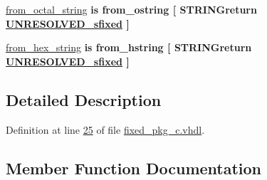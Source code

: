 \begin{DoxyCompactItemize}
\item 
\hyperlink{classfixed__pkg_ad03780406d82a1039546103c01b05ab0}{from\+\_\+octal\+\_\+string}  {\bfseries {\bfseries \textcolor{keywordflow}{is}\textcolor{vhdlchar}{ }\textcolor{vhdlchar}{from\+\_\+ostring}\textcolor{vhdlchar}{ }\textcolor{vhdlchar}{\mbox{[}}\textcolor{vhdlchar}{ }\textcolor{vhdlchar}{S\+T\+R\+I\+N\+Greturn}\textcolor{vhdlchar}{ }{\bfseries \hyperlink{classfixed__pkg_aa723b28a027c3c0f9bca02d75e8df4d6}{U\+N\+R\+E\+S\+O\+L\+V\+E\+D\+\_\+sfixed}} \textcolor{vhdlchar}{ }\textcolor{vhdlchar}{\mbox{]}}\textcolor{vhdlchar}{ }}} {\bfseries \textcolor{vhdlchar}{ }} 
\item 
\hyperlink{classfixed__pkg_a77fc6c4053e07d7a80d3450a6d2b06d6}{from\+\_\+hex\+\_\+string}  {\bfseries {\bfseries \textcolor{keywordflow}{is}\textcolor{vhdlchar}{ }\textcolor{vhdlchar}{from\+\_\+hstring}\textcolor{vhdlchar}{ }\textcolor{vhdlchar}{\mbox{[}}\textcolor{vhdlchar}{ }\textcolor{vhdlchar}{S\+T\+R\+I\+N\+Greturn}\textcolor{vhdlchar}{ }{\bfseries \hyperlink{classfixed__pkg_aa723b28a027c3c0f9bca02d75e8df4d6}{U\+N\+R\+E\+S\+O\+L\+V\+E\+D\+\_\+sfixed}} \textcolor{vhdlchar}{ }\textcolor{vhdlchar}{\mbox{]}}\textcolor{vhdlchar}{ }}} {\bfseries \textcolor{vhdlchar}{ }} 
\end{DoxyCompactItemize}


\subsection{Detailed Description}


Definition at line \hyperlink{fixed__pkg__c_8vhdl_source_l00025}{25} of file \hyperlink{fixed__pkg__c_8vhdl_source}{fixed\+\_\+pkg\+\_\+c.\+vhdl}.



\subsection{Member Function Documentation}
\hypertarget{classfixed__pkg_a29826fcafea88257a94a5fcc9ededcba}{}
